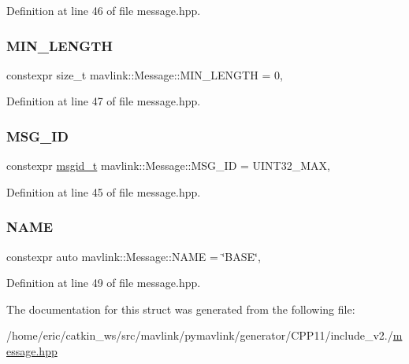 Definition at line 46 of file message.\+hpp.

\mbox{\label{structmavlink_1_1Message_ae5e5cad97fc4b3e648c0a05f504d8770}} 
\subsubsection{\texorpdfstring{MIN\_LENGTH}{MIN\_LENGTH}}
{\footnotesize\ttfamily constexpr size\+\_\+t mavlink\+::\+Message\+::\+M\+I\+N\+\_\+\+L\+E\+N\+G\+TH = 0\hspace{0.3cm}{\ttfamily [static]}, {\ttfamily [constexpr]}}



Definition at line 47 of file message.\+hpp.

\mbox{\label{structmavlink_1_1Message_a7f0f3c243218c213c80b88967607630e}} 
\subsubsection{\texorpdfstring{MSG\_ID}{MSG\_ID}}
{\footnotesize\ttfamily constexpr \mbox{\hyperlink{namespacemavlink_a98a1fe49b380ed1ea252d2c13bf3278d}{msgid\+\_\+t}} mavlink\+::\+Message\+::\+M\+S\+G\+\_\+\+ID = U\+I\+N\+T32\+\_\+\+M\+AX\hspace{0.3cm}{\ttfamily [static]}, {\ttfamily [constexpr]}}



Definition at line 45 of file message.\+hpp.

\mbox{\label{structmavlink_1_1Message_a8c65d1ee019780792fa21e2502b5306b}} 
\subsubsection{\texorpdfstring{NAME}{NAME}}
{\footnotesize\ttfamily constexpr auto mavlink\+::\+Message\+::\+N\+A\+ME = \char`\"{}B\+A\+SE\char`\"{}\hspace{0.3cm}{\ttfamily [static]}, {\ttfamily [constexpr]}}



Definition at line 49 of file message.\+hpp.



The documentation for this struct was generated from the following file\+:\begin{DoxyCompactItemize}
\item 
/home/eric/catkin\+\_\+ws/src/mavlink/pymavlink/generator/\+C\+P\+P11/include\+\_\+v2./\mbox{\hyperlink{message_8hpp}{message.\+hpp}}\end{DoxyCompactItemize}
